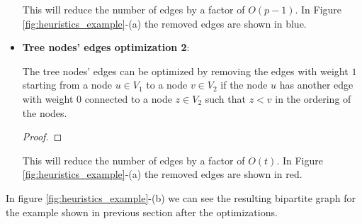 \begin{itemize}
    This will reduce the number of edges by a factor of $O(p - 1)$. In Figure \ref{fig:heuristics_example}-(a) the removed edges are shown in blue.

    \item \textbf{Tree nodes' edges optimization 2}:
    \begin{lemma} \label{lemma:tree_optimization_2}
        The tree nodes' edges can be optimized by removing the edges with weight $1$ starting from a node $u \in V_1$ to a node $v \in V_2$ if the node $u$ has another edge with weight $0$ connected to a node $z \in V_2$ such that $z < v$ in the ordering of the nodes.
    \end{lemma}

    \begin{proof}
        
    \end{proof}

    This will reduce the number of edges by a factor of $O(t)$. In Figure \ref{fig:heuristics_example}-(a) the removed edges are shown in red.
\end{itemize}

In figure \ref{fig:heuristics_example}-(b) we can see the resulting bipartite graph for the example shown in previous section after the optimizations.

